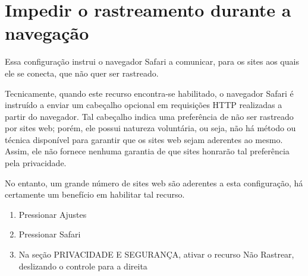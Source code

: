 \section{Impedir o rastreamento durante a navega\c c\~ao}

Essa configura\c c\~ao instrui o navegador Safari a comunicar, para os sites aos quais ele se conecta, que n\~ao quer ser rastreado.

Tecnicamente, quando este recurso encontra-se habilitado, o navegador Safari \'e instru\'ido a enviar um cabe\c calho opcional em requisi\c c\~oes HTTP realizadas a partir do navegador. Tal cabe\c calho indica uma prefer\^encia de n\~ao ser rastreado por sites web; por\'em, ele possui natureza volunt\'aria, ou seja, n\~ao h\'a m\'etodo ou t\'ecnica dispon\'ivel para garantir que os sites web sejam aderentes ao mesmo. Assim, ele n\~ao fornece nenhuma garantia de que sites honrar\~ao tal prefer\^encia pela privacidade. 

No entanto, um grande n\'umero de sites web s\~ao aderentes a esta configura\c c\~ao, h\'a certamente um benef\'icio em habilitar tal recurso.

\begin{enumerate}
\item Pressionar Ajustes
\item Pressionar Safari
\item Na se\c c\~ao PRIVACIDADE E SEGURAN\c CA, ativar o recurso N\~ao Rastrear, deslizando o controle para a direita
\end{enumerate}
